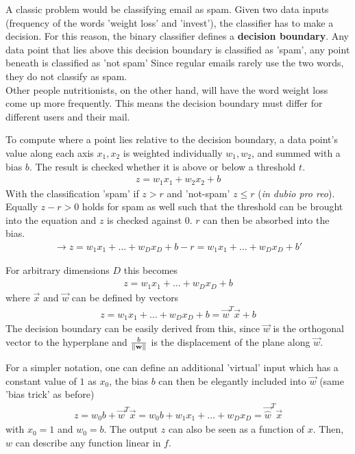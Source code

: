 A classic problem would be classifying email as spam.
Given two data inputs (\ie frequency of the words 'weight loss' and 'invest'), the classifier has to make a decision.
For this reason, the binary classifier defines a \textbf{decision boundary}.
Any data point that lies above this decision boundary is classified as 'spam', any point beneath is classified as 'not spam'
Since regular emails rarely use the two words, they do not classify as spam.\\
Other people \ie nutritionists, on the other hand, will have the word weight loss come up more frequently.
This means the decision boundary must differ for different users and their mail.

To compute where a point lies relative to the decision boundary, a data point's value along each axis $x_1, x_2$ is weighted individually $w_1, w_2$, and summed with a bias $b$.
The result is checked whether it is above or below a threshold $t$.
\begin{align}
    z = w_1 x_1 + w_2 x_2 + b
\end{align}
With the classification 'spam' if $z > r$ and 'not-spam' $z \leq r$ (\textit{in dubio pro reo}).
Equally $z - r > 0$ holds for spam as well such that the threshold can be brought into the equation and $z$ is checked against $0$.
$r$ can then be absorbed into the bias.
\begin{align}
    \rightarrow z = w_1 x_1 + \hdots + w_D x_D + b - r = w_1 x_1 + \hdots + w_D x_D + b'
\end{align}

For arbitrary dimensions $D$ this becomes
\begin{align}
    z = w_1 x_1 + \hdots + w_D x_D + b
\end{align}
 where $\vec{x}$ and $\vec{w}$ can be defined by vectors
\begin{align}
    z = w_1 x_1 + \hdots + w_D x_D + b = \vec{w}^T \vec{x} + b
\end{align}
The decision boundary can be easily derived from this, since $\vec{w}$ is the orthogonal vector to the hyperplane and $\frac{b}{\left\lVert\mathbf{w}\right\rVert}$ is the displacement of the plane along $\vec{w}$.

For a simpler notation, one can define an additional 'virtual' input which has a constant value of $1$ as $x_0$, the bias $b$ can then be elegantly included into $\vec{w}$ (same 'bias trick' as before)
\begin{align}
    z = w_0 b + \vec{w}^T \vec{x} = w_0 b + w_1 x_1 + \hdots + w_D x_D = \vec{\hat{w}}^T \vec{x}
\end{align}
with $x_0 = 1$ and $w_0 = b$.
The output $z$ can also be seen as a function of $x$.
Then, $w$ can describe any function linear in $f$.

